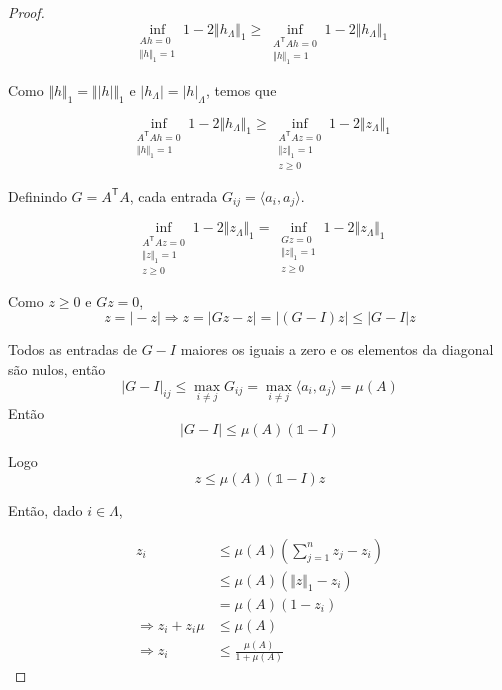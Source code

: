 \begin{proof}
$$ \inf_{\substack{Ah = 0 \\ \Vert h \Vert_1 = 1}} 1 - 2 \Vert h_\Lambda \Vert_1
\geq \inf_{\substack{A^{\mathsf{T}}Ah = 0 \\ \Vert h \Vert_1 = 1}} 1 - 2 \Vert h_\Lambda \Vert_1$$

Como $ \Vert h \Vert_1 = \Vert \vert h \vert \Vert_1$ e $\vert h_\Lambda \vert = \vert h \vert_\Lambda$, temos que

$$\inf_{\substack{A^{\mathsf{T}}Ah = 0 \\ \Vert h \Vert_1 = 1}} 1 - 2 \Vert h_\Lambda \Vert_1
\geq \inf_{\substack{A^{\mathsf{T}}Az = 0 \\ \Vert z \Vert_1 = 1 \\ z \geq 0}}
1 - 2 \Vert z_\Lambda \Vert_1$$

Definindo $G = A^{\mathsf{T}}A$, cada entrada $G_{ij} = \langle a_i, a_j \rangle$.

$$\inf_{\substack{A^{\mathsf{T}}Az = 0 \\ \Vert z \Vert_1 = 1 \\ z \geq 0}}
1 - 2 \Vert z_\Lambda \Vert_1
=
\inf_{\substack{Gz = 0 \\ \Vert z \Vert_1 = 1 \\ z \geq 0}}
1 - 2 \Vert z_\Lambda \Vert_1$$

Como $z \geq 0$ e $Gz = 0$,
$$ z = \vert -z \vert \Rightarrow z = \vert Gz - z \vert
= \vert (G - I)z \vert \leq \vert G - I \vert z
$$

Todos as entradas de $G - I$ maiores os iguais a zero e os elementos da diagonal são nulos, então
$$ \vert G - I \vert_{ij} \leq \max_{i \neq j} G_{ij} = \max_{i \neq j} \langle a_i, a_j \rangle = \mu(A)$$
Então
$$ \vert G - I \vert \leq \mu(A) (\mathbb{1} - I)$$

Logo
$$ z \leq \mu(A) (\mathbb{1} - I) z$$

Então, dado $i \in \Lambda$,

\begin{subequations}
\begin{align*}
z_i & \leq \mu(A) \left( \sum_{j = 1}^n z_j - z_i \right) \\
& \leq \mu(A) (\Vert z \Vert_1  - z_i) \\
& = \mu(A)(1 - z_i) \\
\Rightarrow z_i + z_i\mu & \leq \mu(A)\\
\Rightarrow z_i &\leq \frac{\mu(A)}{1 + \mu(A)}
\end{align*}
\end{subequations}


\end{proof}
